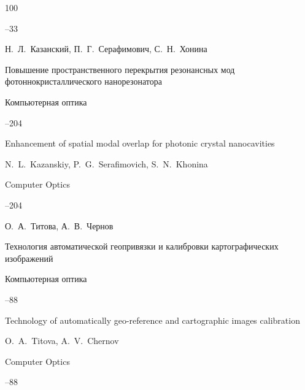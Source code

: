 \begin{thebibliography}{100}



--33






\by Н.~Л.~Казанский, П.~Г.~Серафимович, С.~Н.~Хонина

\paper Повышение пространственного перекрытия резонансных мод фотоннокристаллического нанорезонатора

\jour Компьютерная оптика




--204

\misctransl

\paper Enhancement of spatial modal overlap for photonic crystal nanocavities

\by N.~L.~Kazanskiy, P.~G.~Serafimovich, S.~N.~Khonina

\jour Computer Optics




--204








\by О.~А.~Титова, А.~В.~Чернов

\paper Технология автоматической геопривязки и калибровки картографических изображений

\jour Компьютерная оптика




--88

\misctransl

\paper Technology of automatically geo-reference and cartographic images calibration

\by O.~A.~Titova, A.~V.~Chernov 

\jour Computer Optics




--88






\end{thebibliography}
